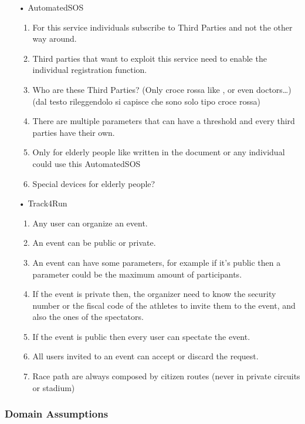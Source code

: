 \begin{enumerate}
\item[•] {\Large AutomatedSOS}
	\begin{enumerate}
	\item For this service individuals subscribe to Third Parties and not the other way around.
    \item Third parties that want to exploit this service need to enable the individual registration function.
    \item Who are these Third Parties? (Only croce rossa like , or even doctors…) (dal testo rileggendolo si capisce che sono solo tipo croce rossa)
    \item There are multiple parameters that can have a threshold and every third parties have their own.
    \item Only for elderly people like written in the document or any individual could use this AutomatedSOS
    \item Special devices for elderly people?	
	\end{enumerate}
\item[•] {\Large Track4Run}
	\begin{enumerate}
	\item Any user can organize an event.
    \item An event can be public or private.
    \item An event can have some parameters, for example if it’s public then a parameter could be the maximum amount of participants.
    \item If the event is private then, the organizer need to know the security number or the fiscal code of the athletes to invite them to the event, and also the ones of the spectators.
    \item If the event is public then every user can spectate the event.
    \item All users invited to an event can accept or discard the request.
    \item Race path are always composed by citizen routes (never in private circuits or stadium)
    \end{enumerate}
\end{enumerate}

\subsubsection{Domain Assumptions}

